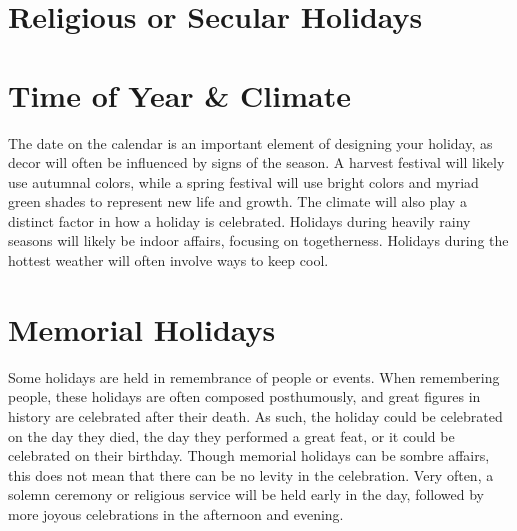 \documentclass[10pt,a4paper,twoside,twocolumn,openany,bg=print,nodeprecatedcode]{dndbook}
\begin{document}
\section{Religious or Secular Holidays}

\section{Time of Year \& Climate}
The date on the calendar is an important element of designing your holiday, as decor will often be influenced by signs of the season. A harvest festival will likely use autumnal colors, while a spring festival will use bright colors and myriad green shades to represent new life and growth.
The climate will also play a distinct factor in how a holiday is celebrated. Holidays during heavily rainy seasons will likely be indoor affairs, focusing on togetherness. Holidays during the hottest weather will often involve ways to keep cool.
\section{Memorial Holidays}
Some holidays are held in remembrance of people or events. When remembering people, these holidays are often composed posthumously, and great figures in history are celebrated after their death. As such, the holiday could be celebrated on the day they died, the day they performed a great feat, or it could be celebrated on their birthday.
Though memorial holidays can be sombre affairs, this does not mean that there can be no levity in the celebration. Very often, a solemn ceremony or religious service will be held early in the day, followed by more joyous celebrations in the afternoon and evening.
\end{document}
